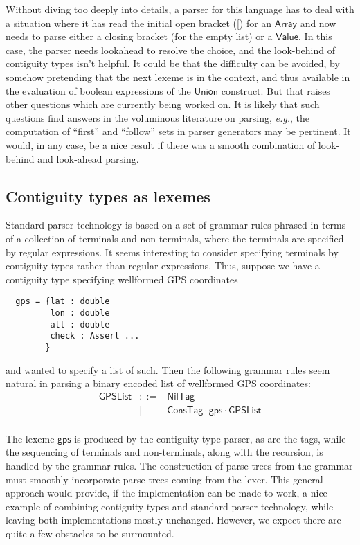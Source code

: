 \documentclass{article}
\newcommand{\eg}{\textit{e.g.}}
\newcommand{\konst}[1]{\ensuremath{\mathsf{#1}}}
\theoremstyle{definition}
\begin{document}
Without diving too deeply into details, a parser for this language has
to deal with a situation where it has read the initial open bracket
([) for an \konst{Array} and now needs to parse either a closing
  bracket (for the empty list) or a \konst{Value}. In this case, the
  parser needs lookahead to resolve the choice, and the look-behind of
  contiguity types isn't helpful. It could be that the difficulty can
  be avoided, by somehow pretending that the next lexeme is in the
  context, and thus available in the evaluation of boolean expressions
  of the \konst{Union} construct. But that raises other questions
  which are currently being worked on. It is likely that such
  questions find answers in the voluminous literature on parsing, \eg,
  the computation of ``first'' and ``follow'' sets in parser
  generators may be pertinent. It would, in any case, be a nice result
  if there was a smooth combination of look-behind and look-ahead
  parsing.

\subsection{Contiguity types as lexemes}

Standard parser technology is based on a set of grammar rules phrased
in terms of a collection of terminals and non-terminals, where the
terminals are specified by regular expressions. It seems interesting
to consider specifying terminals by contiguity types rather than
regular expressions. Thus, suppose we have a contiguity type
specifying wellformed GPS coordinates

{\small
\begin{verbatim}
  gps = {lat : double
         lon : double
         alt : double
         check : Assert ...
        }
\end{verbatim}}

and wanted to specify a list of such. Then the following grammar rules
seem natural in parsing a binary encoded list of wellformed GPS
coordinates:
\[
\begin{array}{rcl}
 \konst{GPSList} & ::=  & \konst{NilTag} \\
                 & \mid & \konst{ConsTag} \cdot \konst{gps} \cdot \konst{GPSList} \\
\end{array}
\]

The lexeme \konst{gps} is produced by the contiguity type parser, as
are the tags, while the sequencing of terminals and non-terminals,
along with the recursion, is handled by the grammar rules. The
construction of parse trees from the grammar must smoothly incorporate
parse trees coming from the lexer. This general approach would
provide, if the implementation can be made to work, a nice example of
combining contiguity types and standard parser technology, while
leaving both implementations mostly unchanged. However, we expect
there are quite a few obstacles to be surmounted.
\end{document}
